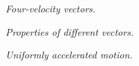 \documentclass{report}
\begin{document}
\begin{subquests}
	\item \emph{Four-velocity vectors.}
	\begin{subquests}
		\item

		\item
	\end{subquests}

	\item \emph{Properties of different vectors.}
	\begin{subquests}
		\item

		\item
	\end{subquests}
	
	\item \emph{Uniformly accelerated motion.}
	\begin{subquests}
		\item


\end{subquests}
\end{subquests}
\end{document}
